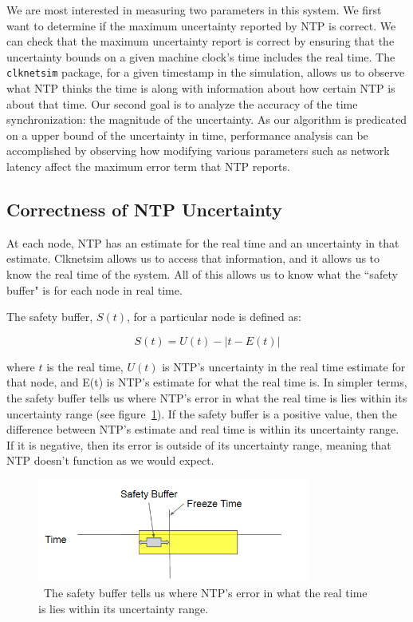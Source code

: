 We are most interested in measuring two parameters in
this system. We first want to determine if the maximum uncertainty
reported by NTP is correct. We can check that the maximum uncertainty
report is correct by ensuring that the uncertainty bounds on a given machine
clock's time includes the real time.
The \texttt{clknetsim} package, for a
given timestamp in the simulation, allows us to observe what NTP
thinks the time is along with information about how certain NTP is
about that time. Our second goal is to analyze the accuracy of the time
synchronization: the magnitude of the uncertainty. 
As our algorithm is predicated on a upper
bound of the uncertainty in time, performance analysis can be
accomplished by observing how modifying various parameters such as
network latency affect the maximum error term that NTP reports.

\subsection{Correctness of NTP Uncertainty}

At each node, NTP has an estimate for the real time and an uncertainty
in that estimate. Clknetsim allows us to access that information, and
it allows us to know the real time of the system. All of this allows
us to know what the ``safety buffer" is for each node in real time.

The safety buffer, $S(t)$,  for a particular node is defined as:

\[ S(t) = U(t) - | t - E(t)| \]

where $t$ is the real time, $U(t)$ is NTP's uncertainty in the real
time estimate for that node, and E(t) is NTP's estimate for what the
real time is. In simpler terms, the safety buffer tells us where NTP's
error in what the real time is lies within its uncertainty range (see
figure~\ref{fig:safety-diag}). If the safety buffer is a positive
value, then the difference between NTP's estimate and real time is
within its uncertainty range. If it is negative, then its error is
outside of its uncertainty range, meaning that NTP doesn't function as
we would expect.

\begin{figure}[h]
  \caption{~The safety buffer tells us where NTP's error in what the real time is lies within its uncertainty range.} 
  \label{fig:safety-diag}
  \centering
  \includegraphics[width=0.8\textwidth]{safety-diagram.png}
\end{figure}

